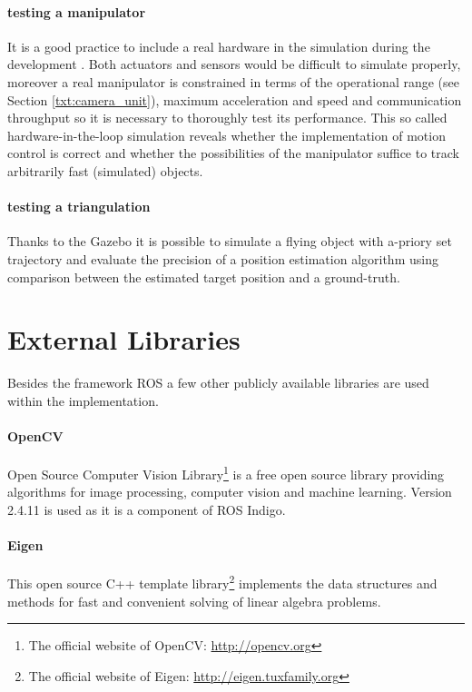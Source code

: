 	\paragraph{testing a manipulator} It is a good practice to include a real hardware in the simulation during the development \cite{on_hw_in_the_loop}. Both actuators and sensors would be difficult to simulate properly, moreover a real manipulator is constrained in terms of the operational range (see Section \ref{txt:camera_unit}), maximum acceleration and speed and communication throughput so it is necessary to thoroughly test its performance. This so called hardware-in-the-loop simulation reveals whether the implementation of motion control is correct and whether the possibilities of the manipulator suffice to track arbitrarily fast (simulated) objects.
	
	\paragraph{testing a triangulation} Thanks to the Gazebo it is possible to simulate a flying object with a-priory set trajectory and evaluate the precision of a position estimation algorithm using comparison between the estimated target position and a ground-truth.
	
	\section{External Libraries} \label{txt:external_libraries}
	
	Besides the framework ROS a few other publicly available libraries are used within the implementation.
	
	\paragraph{OpenCV} Open Source Computer Vision Library\footnote{The official website of OpenCV: \url{http://opencv.org}} is a free open source library providing algorithms for image processing, computer vision and machine learning. Version 2.4.11 is used as it is a component of ROS Indigo.
	
	\paragraph{Eigen} This open source C++ template library\footnote{The official website of Eigen: \url{http://eigen.tuxfamily.org}} implements the data structures and methods for fast and convenient solving of linear algebra problems.
	
